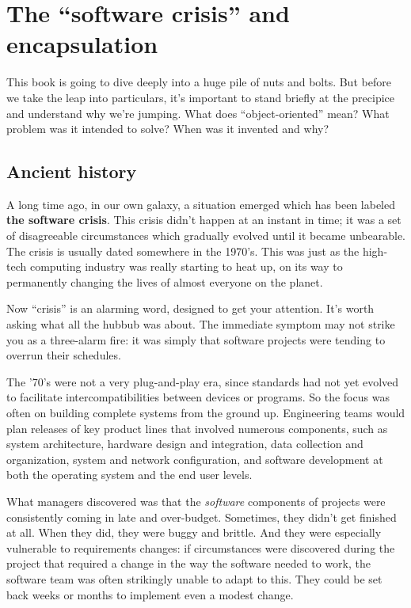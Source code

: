 
\chapter{The ``software crisis'' and encapsulation}

This book is going to dive deeply into a huge pile of nuts and bolts. But
before we take the leap into particulars, it's important to stand briefly at
the precipice and understand why we're jumping. What does ``object-oriented''
mean? What problem was it intended to solve? When was it invented and why?

\section{Ancient history}

A long time ago, in our own galaxy, a situation emerged which has been labeled
\textbf{the software crisis}. This crisis didn't happen at an instant in time;
it was a set of disagreeable circumstances which gradually evolved until it
became unbearable. The crisis is usually dated somewhere in the 1970's. This
was just as the high-tech computing industry was really starting to heat up,
on its way to permanently changing the lives of almost everyone on the planet.

Now ``crisis'' is an alarming word, designed to get your attention. It's worth
asking what all the hubbub was about. The immediate symptom may not strike you
as a three-alarm fire: it was simply that software projects were tending to
overrun their schedules.

The '70's were not a very plug-and-play era, since standards had not yet
evolved to facilitate intercompatibilities between devices or programs. So the
focus was often on building complete systems from the ground up. Engineering
teams would plan releases of key product lines that involved numerous
components, such as system architecture, hardware design and integration, data
collection and organization, system and network configuration, and software
development at both the operating system and the end user levels.

What managers discovered was that the \textit{software} components of projects
were consistently coming in late and over-budget. Sometimes, they didn't get
finished at all. When they did, they were buggy and brittle. And they were
especially vulnerable to requirements changes: if circumstances were
discovered during the project that required a change in the way the software
needed to work, the software team was often strikingly unable to adapt to
this. They could be set back weeks or months to implement even a modest
change.

